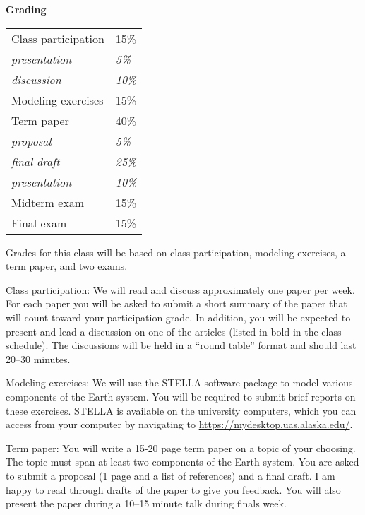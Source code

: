 \documentclass[11pt,letterpaper]{article}
\newcommand{\squeezeup}{\vspace{-2.5mm}}
\begin{document}
\clearpage
\textbf{Grading} 
\begin{table}[h!]
\squeezeup
\begin{tabular}{ll}
Class participation & 15\%\\
\hspace{15pt}\textit{presentation} &\hspace{15pt}\textit{5\%}\\
\hspace{15pt}\textit{discussion} & \hspace{15pt}\textit{10\%}\\
Modeling exercises & 15\%\\
Term paper & 40\%\\
\hspace{15pt}\textit{proposal} & \hspace{15pt}\textit{5\%}\\
\hspace{15pt}\textit{final draft} & \hspace{15pt}\textit{25\%}\\
\hspace{15pt}\textit{presentation} & \hspace{15pt}\textit{10\%}\\
Midterm exam & 15\%\\
Final exam & 15\%
\end{tabular}
\end{table}

Grades for this class will be based on class participation, modeling exercises, a term paper, and two exams.

Class participation: We will read and discuss approximately one paper per week. For each paper you will be asked to submit a short summary of the paper that will count toward your participation grade. In addition, you will be expected to present and lead a discussion on one of the articles (listed in bold in the class schedule). The discussions will be held in a ``round table'' format and should last 20--30 minutes. 

Modeling exercises: We will use the STELLA software package to model various components of the Earth system. You will be required to submit brief reports on these exercises. STELLA is available on the university computers, which you can access from your computer by navigating to \url{https://mydesktop.uas.alaska.edu/}.

Term paper: You will write a 15-20 page term paper on a topic of your choosing. The topic must span at least two components of the Earth system. You are asked to submit a proposal (1 page and a list of references) and a final draft. I am happy to read through drafts of the paper to give you feedback. You will also present the paper during a 10--15 minute talk during finals week.
\end{document}

